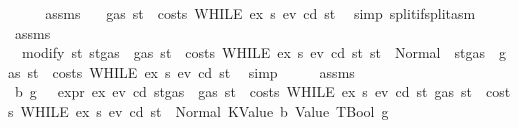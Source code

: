 \begin{isabellebody}
\ {\isacharminus}{\kern0pt}\isanewline
\ \ \isamarkupfalse%
\ assms\ \isamarkupfalse%
\ {}{\isacharcolon}{\kern0pt}\ {\isachardoublequoteopen}gas\ st\ {\isachargreater}{\kern0pt}\ costs\ {\isacharparenleft}{\kern0pt}WHILE\ ex\ s{}{\isacharparenright}{\kern0pt}\ ev\ cd\ st{\isachardoublequoteclose}\ \isamarkupfalse%
\ {\isacharparenleft}{\kern0pt}simp\ split{\isacharcolon}{\kern0pt}if{\isacharunderscore}{\kern0pt}split{\isacharunderscore}{\kern0pt}asm{\isacharparenright}{\kern0pt}\isanewline
\ \ \isamarkupfalse%
\ \isamarkupfalse%
\ assms\ {}\ \isamarkupfalse%
\ {}{\isacharcolon}{\kern0pt}\ {\isachardoublequoteopen}modify\ {\isacharparenleft}{\kern0pt}{\isasymlambda}st{\isachardot}{\kern0pt}\ st{\isasymlparr}gas\ {\isacharcolon}{\kern0pt}{\isacharequal}{\kern0pt}\ gas\ st\ {\isacharminus}{\kern0pt}\ costs\ {\isacharparenleft}{\kern0pt}WHILE\ ex\ s{}{\isacharparenright}{\kern0pt}\ ev\ cd\ st{\isasymrparr}{\isacharparenright}{\kern0pt}\ st\ {\isacharequal}{\kern0pt}\ Normal\ {\isacharparenleft}{\kern0pt}{\isacharparenleft}{\kern0pt}{\isacharparenright}{\kern0pt}{\isacharcomma}{\kern0pt}\ st{\isasymlparr}gas\ {\isacharcolon}{\kern0pt}{\isacharequal}{\kern0pt}\ gas\ st\ {\isacharminus}{\kern0pt}\ costs\ {\isacharparenleft}{\kern0pt}WHILE\ ex\ s{}{\isacharparenright}{\kern0pt}\ ev\ cd\ st{\isasymrparr}{\isacharparenright}{\kern0pt}{\isachardoublequoteclose}\ \isamarkupfalse%
\ simp\isanewline
\ \ \isamarkupfalse%
\ \isamarkupfalse%
\ assms\ {}\ {}\ \isamarkupfalse%
\ b\ g\ \ {}{\isacharcolon}{\kern0pt}\ {\isachardoublequoteopen}expr\ ex\ ev\ cd\ {\isacharparenleft}{\kern0pt}st{\isasymlparr}gas\ {\isacharcolon}{\kern0pt}{\isacharequal}{\kern0pt}\ gas\ st\ {\isacharminus}{\kern0pt}\ costs\ {\isacharparenleft}{\kern0pt}WHILE\ ex\ s{}{\isacharparenright}{\kern0pt}\ ev\ cd\ st{\isasymrparr}{\isacharparenright}{\kern0pt}\ {\isacharparenleft}{\kern0pt}gas\ st\ {\isacharminus}{\kern0pt}\ costs\ {\isacharparenleft}{\kern0pt}WHILE\ ex\ s{}{\isacharparenright}{\kern0pt}\ ev\ cd\ st{\isacharparenright}{\kern0pt}\ {\isacharequal}{\kern0pt}\ Normal\ {\isacharparenleft}{\kern0pt}{\isacharparenleft}{\kern0pt}KValue\ b{\isacharcomma}{\kern0pt}\ Value\ TBool{\isacharparenright}{\kern0pt}{\isacharcomma}{\kern0pt}\ g{\isacharparenright}{\kern0pt}{\isachardoublequoteclose}\ \isamarkupfalse%

\end{isabellebody}
